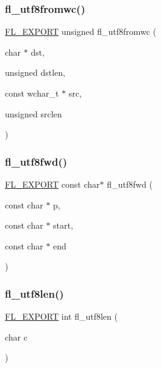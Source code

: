 \subsubsection{\texorpdfstring{fl\+\_\+utf8fromwc()}{fl\_utf8fromwc()}}
{\footnotesize\ttfamily \hyperlink{_fl___export_8_h_aa9ba29a18aee9d738370a06eeb4470fc}{F\+L\+\_\+\+E\+X\+P\+O\+RT} unsigned fl\+\_\+utf8fromwc (\begin{DoxyParamCaption}\item[{char $\ast$}]{dst,  }\item[{unsigned}]{dstlen,  }\item[{const wchar\+\_\+t $\ast$}]{src,  }\item[{unsigned}]{srclen }\end{DoxyParamCaption})}

\mbox{\label{group__fl__unicode_ga4d7d32a8143c5b85afb4eb82093c2fb2}} 
\subsubsection{\texorpdfstring{fl\+\_\+utf8fwd()}{fl\_utf8fwd()}}
{\footnotesize\ttfamily \hyperlink{_fl___export_8_h_aa9ba29a18aee9d738370a06eeb4470fc}{F\+L\+\_\+\+E\+X\+P\+O\+RT} const char$\ast$ fl\+\_\+utf8fwd (\begin{DoxyParamCaption}\item[{const char $\ast$}]{p,  }\item[{const char $\ast$}]{start,  }\item[{const char $\ast$}]{end }\end{DoxyParamCaption})}

\mbox{\label{group__fl__unicode_ga5d0c96f9df2770b22901588632af4a87}} 
\subsubsection{\texorpdfstring{fl\+\_\+utf8len()}{fl\_utf8len()}}
{\footnotesize\ttfamily \hyperlink{_fl___export_8_h_aa9ba29a18aee9d738370a06eeb4470fc}{F\+L\+\_\+\+E\+X\+P\+O\+RT} int fl\+\_\+utf8len (\begin{DoxyParamCaption}\item[{char}]{c }\end{DoxyParamCaption})}

